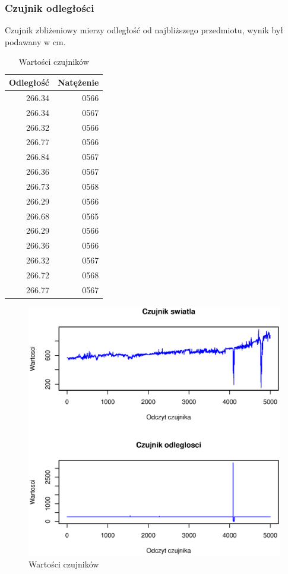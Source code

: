 \subsubsection*{Czujnik odległości}
Czujnik zbliżeniowy mierzy odległość od najbliższego przedmiotu,
wynik był podawany w cm.
\begin{table}[h]
  \label{tab:DeviceValues}
  \centering
  \begin{tabular}{r r}
    \multicolumn{1}{l}{Odległość} & \multicolumn{1}{l}{Natężenie} \\
    \hline
    266.34 & 0566 \\
    266.34 & 0567 \\
    266.32 & 0566 \\
    266.77 & 0566 \\
    266.84 & 0567 \\
    266.36 & 0567 \\
    266.73 & 0568 \\
    266.29 & 0566 \\
    266.68 & 0565 \\
    266.29 & 0566 \\
    266.36 & 0566 \\
    266.32 & 0567 \\
    266.72 & 0568 \\
    266.77 & 0567 \\
  \end{tabular}
  \caption{Wartości czujników}
\end{table}
\begin{figure}[htbp]
  \centering
  \includegraphics[width=1\textwidth]{img/ch-5-device}
  \caption{Wartości czujników}
  \label{fig:DeviceValues}
\end{figure}
\newpage

